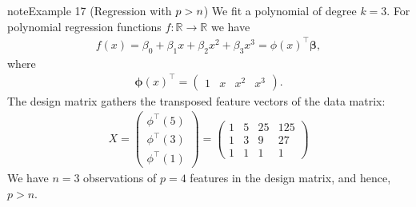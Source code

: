 \documentclass[letterpaper,10pt,english]{jupyterBook}
\begin{document}
\begin{sphinxadmonition}{note}{Example 17 (Regression with \protect\(p>n\protect\))}
\sphinxAtStartPar
We fit a polynomial of degree \(k=3\). For polynomial regression functions \(f:\mathbb{R}\rightarrow\mathbb{R}\) we have
\begin{equation*}
\begin{split}f(x) = \beta_0 +\beta_1 x+ \beta_2x^2 + \beta_3x^3 = \phi(x)^\top\bm\beta,\end{split}
\end{equation*}
where
\begin{equation*}
\begin{split}\bm\phi(x)^\top=\begin{pmatrix}1& x& x^2& x^3\end{pmatrix}.\end{split}
\end{equation*}
The design matrix gathers the transposed feature vectors of the data matrix:
\begin{equation*}
\begin{split}X = \begin{pmatrix} \phi^\top(5)\\ \phi^\top(3)\\ \phi^\top(1)\end{pmatrix} = \begin{pmatrix} 1 & 5 & 25 & 125\\ 1 & 3 & 9 & 27\\ 1 & 1 & 1 & 1\end{pmatrix}\end{split}
\end{equation*}
We have \(n=3\) observations of \(p=4\) features in the design matrix, and hence, \(p>n\).


\end{sphinxadmonition}
\end{document}
